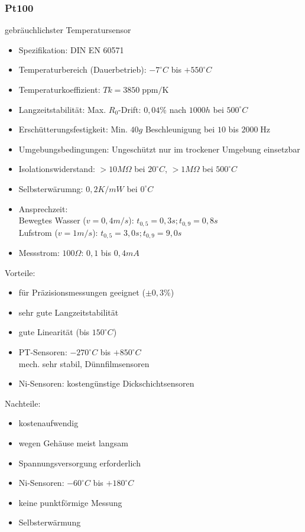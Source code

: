 \documentclass{scrreprt}
\begin{document}
\subsubsection{Pt100}
gebräuchlichster Temperatursensor
\begin{itemize}
\item Spezifikation: DIN EN 60571
\item Temperaturbereich (Dauerbetrieb): $-7^\circ C$ bis $+550^\circ C$
\item Temperaturkoeffizient: $Tk=3850 \;\mathrm{ppm/K}$
\item Langzeitstabilität: Max. $R_0$-Drift: $0,04\%$ nach $1000h$ bei $500^\circ C$
\item Erschütterungsfestigkeit: Min. $40g$ Beschleunigung bei $10$ bis $2000\;\mathrm{Hz}$
\item Umgebungsbedingungen: Ungeschützt nur im trockener Umgebung einsetzbar
\item Isolationswiderstand: $>10 M\Omega$ bei $20^\circ C$, $>1 M\Omega$ bei $500^\circ C$
\item Selbsterwärumng: $0,2K/mW$ bei $0^\circ C$
\item Ansprechzeit: \\
Bewegtes Wasser ($v=0,4m/s$): $t_{0,5}=0,3s; t_{0,9}=0,8s$\\
Lufstrom ($v=1m/s$): $t_{0,5}=3,0s;t_{0,9}=9,0s$
\item Messstrom: $100 \Omega$: $0,1$ bis $0,4 mA$
\end{itemize}
Vorteile:
\begin{itemize}[label=$+$]
\item für Präzisionsmessungen geeignet ($\pm 0,3\%$)
\item sehr gute Langzeitstabilität
\item gute Linearität (bis $150^\circ C$)
\item PT-Sensoren: $-270^\circ C$ bis $+850^\circ C$\\
mech. sehr stabil, Dünnfilmsensoren
\item Ni-Sensoren: kostengünstige Dickschichtsensoren
\end{itemize}
Nachteile:
\begin{itemize}[label=$-$]
\item kostenaufwendig
\item wegen Gehäuse meist langsam
\item Spannungsversorgung erforderlich
\item Ni-Sensoren: $-60^\circ C$ bis $+180^\circ C$
\item keine punktförmige Messung
\item Selbsterwärmung
\end{itemize}
\end{document}
